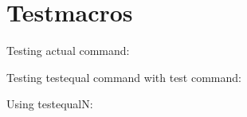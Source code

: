 \section*{Testmacros}
\makeatletter
\indent Testing actual command: \\

Testing testequal command with test command:\\
\noindent{}
\noindent{}

Using testequalN:
\noindent{}
\noindent{}
\makeatother